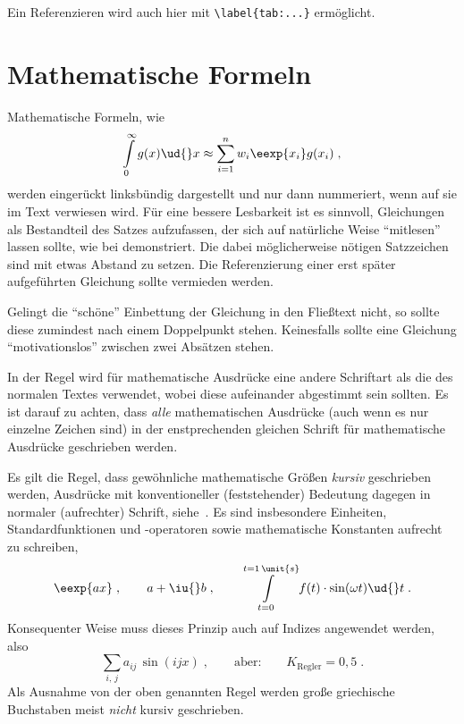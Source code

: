 Ein Referenzieren wird auch hier mit \verb|\label{tab:...}| ermöglicht.




\section{Mathematische Formeln}

Mathematische Formeln, wie
\begin{equation}
  \label{eq:Allgemein-Approx}
  \int\limits_0^\infty g(x)\ud{}x \approx \sum_{i=1}^n w_i\eexp{x_i} g(x_i)\;,
\end{equation}
werden eingerückt linksbündig dargestellt und nur dann nummeriert, wenn auf sie im Text verwiesen wird.
Für eine bessere Lesbarkeit ist es sinnvoll, Gleichungen als Bestandteil des Satzes aufzufassen, der sich auf natürliche Weise "`mitlesen"' lassen sollte, wie \zB bei  demonstriert.
Die dabei möglicherweise nötigen Satzzeichen sind mit etwas Abstand zu setzen.
Die Referenzierung einer erst später aufgeführten Gleichung sollte vermieden werden.

Gelingt die "`schöne"' Einbettung der Gleichung in den Fließtext nicht, so sollte diese zumindest nach einem Doppelpunkt stehen.
Keinesfalls sollte eine Gleichung "`motivationslos"' zwischen zwei Absätzen stehen.

In der Regel wird für mathematische Ausdrücke eine andere Schriftart als die des normalen Textes verwendet, wobei diese aufeinander abgestimmt sein sollten.
Es ist darauf zu achten, dass \emph{alle} mathematischen Ausdrücke (auch wenn es nur einzelne Zeichen sind) in der enstprechenden gleichen Schrift für mathematische Ausdrücke geschrieben werden.

Es gilt die Regel, dass gewöhnliche mathematische Größen \emph{kursiv} geschrieben werden, Ausdrücke mit konventioneller (feststehender) Bedeutung dagegen in normaler (aufrechter) Schrift, siehe~\cite{DIN1338}.
Es sind insbesondere Einheiten, Standardfunktionen und -operatoren sowie mathematische Konstanten aufrecht zu schreiben,
\begin{equation*}
  \eexp{ax}\;,\qquad a+\iu{}b\;,\qquad
  \int\limits_{t=0}^{t=1\,\unit{s}} f(t)\cdot\sin(\omega t)\ud{}t\;.
\end{equation*}
Konsequenter Weise muss dieses Prinzip auch auf Indizes angewendet werden, also \zB
\begin{equation*}
  \sum_{i,\,j}a_{ij}\,\sin(ijx)\;,\qquad\text{aber:}\qquad
  K_\mathrm{Regler} = 0,5\;.
\end{equation*}
Als Ausnahme von der oben genannten Regel werden große griechische Buchstaben meist \emph{nicht} kursiv geschrieben.

